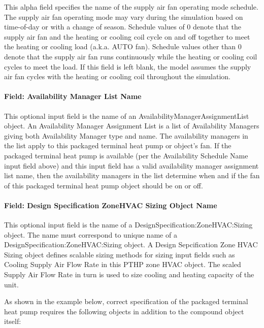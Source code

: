 This alpha field specifies the name of the supply air fan operating mode schedule. The supply air fan operating mode may vary during the simulation based on time-of-day or with a change of season. Schedule values of 0 denote that the supply air fan and the heating or cooling coil cycle on and off together to meet the heating or cooling load (a.k.a. AUTO fan). Schedule values other than 0 denote that the supply air fan runs continuously while the heating or cooling coil cycles to meet the load. If this field is left blank, the model assumes the supply air fan cycles with the heating or cooling coil throughout the simulation.

\paragraph{Field: Availability Manager List Name}\label{field-availability-manager-list-name-7}

This optional input field is the name of an AvailabilityManagerAssignmentList object. An Availability Manager Assignment List is a list of Availability Managers giving both Availability Manager type and name. The availability managers in the list apply to this packaged terminal heat pump or object's fan. If the packaged terminal heat pump is available (per the Availability Schedule Name input field above) and this input field has a valid availability manager assignment list name, then the availability managers in the list determine when and if the fan of this packaged terminal heat pump object should be on or off.

\paragraph{Field: Design Specification ZoneHVAC Sizing Object Name}\label{field-design-specification-zonehvac-sizing-object-name-7}

This optional input field is the name of a DesignSpecification:ZoneHVAC:Sizing object. The name must correspond to unique name of a DesignSpecification:ZoneHVAC:Sizing object. A Design Sepcification Zone HVAC Sizing object defines scalable sizing methods for sizing input fields such as Cooling Supply Air Flow Rate in this PTHP zone HVAC object. The scaled Supply Air Flow Rate in turn is used to size cooling and heating capacity of the unit.

As shown in the example below, correct specification of the packaged terminal heat pump requires the following objects in addition to the compound object itself:

